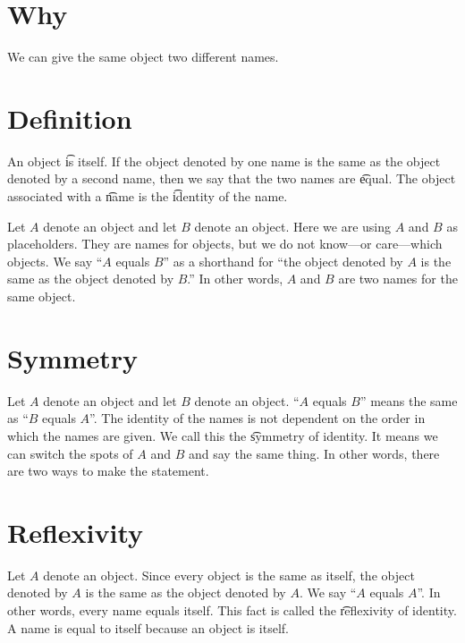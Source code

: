 
\section*{Why}

We can give the same object two different names.

\section*{Definition}

An object \t{is} itself.
If the object denoted by one name is the same as the object denoted by a second name, then we say that the two names are \t{equal}.
The object associated with a \t{name} is the \t{identity} of the name.

Let $A$ denote an object and let $B$ denote an object.
Here we are using $A$ and $B$ as placeholders.
They are names for objects, but we do not know---or care---which objects.
We say ``$A$ equals $B$'' as a shorthand for ``the object denoted by $A$ is the same as the object denoted by $B$.''
In other words, $A$ and $B$ are two names for the same object.

\section*{Symmetry}

Let $A$ denote an object and let $B$ denote an object.
``$A$ equals $B$'' means the same as ``$B$ equals $A$''.
The identity of the names is not dependent on the order in which the names are given.
We call this the \t{symmetry of identity}.
It means we can switch the spots of $A$ and $B$ and say the same thing.
In other words, there are two ways to make the statement.
%  


\section*{Reflexivity}

Let $A$ denote an object.
Since every object is the same as itself, the object denoted by $A$ is the same as the object denoted by $A$.
We say ``$A$ equals $A$''.
In other words, every name equals itself.
This fact is called the \t{reflexivity of identity}.
A name is equal to itself because an object is itself.

